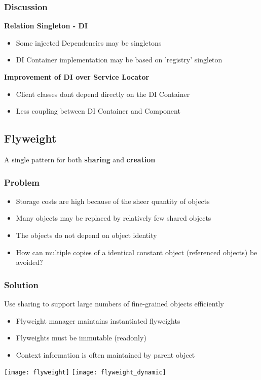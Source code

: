 \subsubsection{Discussion}
\textbf{Relation Singleton - DI}
\begin{itemize}[topsep=0pt]
    \itemsep -0.4em
    \item Some injected Dependencies may be singletons
    \item DI Container implementation may be based on 'registry' singleton
\end{itemize}
\textbf{Improvement of DI over Service Locator}
\begin{itemize}[topsep=0pt]
    \itemsep -0.4em
    \item Client classes dont depend directly on the DI Container
    \item Less coupling between DI Container and Component
\end{itemize}

\subsection{Flyweight}
A single pattern for both \textbf{sharing} and \textbf{creation}
\subsubsection{Problem}
\begin{itemize}[topsep=0pt]
    \itemsep -0.4em
    \item Storage costs are high because of the sheer quantity of objects
    \item Many objects may be replaced by relatively few shared objects
    \item The objects do not depend on object identity
    \item How can multiple copies of a identical constant object (referenced objects) be avoided?
\end{itemize}
\subsubsection{Solution}
Use sharing to support large numbers of fine-grained objects efficiently
\begin{itemize}[topsep=0pt]
    \itemsep -0.4em
    \item Flyweight manager maintains instantiated flyweights
    \item Flyweights must be immutable (readonly)
    \item Context information is often maintained by parent object
\end{itemize}
\texttt{[image: flyweight]}
\texttt{[image: flyweight\_dynamic]}
